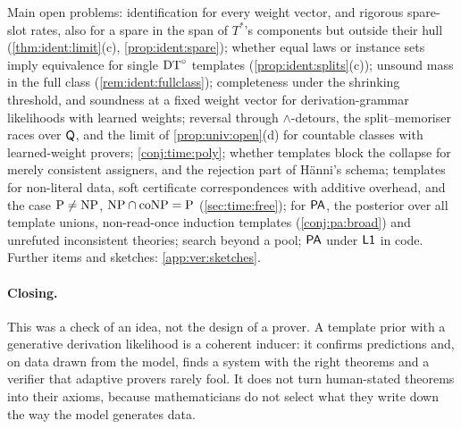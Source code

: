 Main open problems: identification for every weight vector, and rigorous spare-slot rates, also for a spare in the span of $T^*$'s components but outside their hull (\cref{thm:ident:limit}(c), \cref{prop:ident:spare}); whether equal laws or instance sets imply equivalence for single $\mathrm{DT}^{\circ}$ templates (\cref{prop:ident:splits}(c)); unsound mass in the full class (\cref{rem:ident:fullclass}); completeness under the shrinking threshold, and soundness at a fixed weight vector for derivation-grammar likelihoods with learned weights; reversal through $\wedge$-detours, the split--memoriser races over $\mathsf{Q}$, and the limit of \cref{prop:univ:open}(d) for countable classes with learned-weight provers; \cref{conj:time:poly}; whether templates block the collapse for merely consistent assigners, and the rejection part of H\"anni's schema; templates for non-literal data, soft certificate correspondences with additive overhead, and the case $\mathrm{P}\ne\mathrm{NP}$, $\mathrm{NP}\cap\mathrm{coNP}=\mathrm{P}$ (\cref{sec:time:free}); for $\mathsf{PA}$, the posterior over all template unions, non-read-once induction templates (\cref{conj:pa:broad}) and unrefuted inconsistent theories; search beyond a pool; $\mathsf{PA}$ under $\mathord{\mathsf{L1}}$ in code. Further items and sketches: \cref{app:ver:sketches}.

\paragraph{Closing.} This was a check of an idea, not the design of a prover. A template prior with a generative derivation likelihood is a coherent inducer: it confirms predictions and, on data drawn from the model, finds a system with the right theorems and a verifier that adaptive provers rarely fool. It does not turn human-stated theorems into their axioms, because mathematicians do not select what they write down the way the model generates data.
